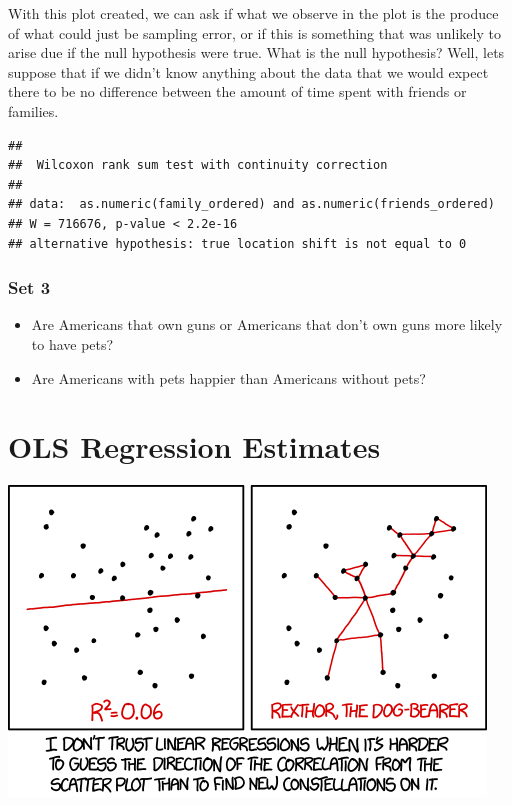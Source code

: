 \documentclass[
]{book}
\newenvironment{Shaded}{\begin{snugshade}}{\end{snugshade}}
\newcommand{\AttributeTok}[1]{\textcolor[rgb]{0.77,0.63,0.00}{#1}}
\newcommand{\ConstantTok}[1]{\textcolor[rgb]{0.00,0.00,0.00}{#1}}
\newcommand{\DocumentationTok}[1]{\textcolor[rgb]{0.56,0.35,0.01}{\textbf{\textit{#1}}}}
\newcommand{\FunctionTok}[1]{\textcolor[rgb]{0.00,0.00,0.00}{#1}}
\newcommand{\NormalTok}[1]{#1}
\newcommand{\SpecialCharTok}[1]{\textcolor[rgb]{0.00,0.00,0.00}{#1}}
\providecommand{\tightlist}{%
  \setlength{\itemsep}{0pt}\setlength{\parskip}{0pt}}
\theoremstyle{definition}
\theoremstyle{definition}
\theoremstyle{definition}
\theoremstyle{definition}
\theoremstyle{remark}
\begin{document}
With this plot created, we can ask if what we observe in the plot is the produce of what could just be sampling error, or if this is something that was unlikely to arise due if the null hypothesis were true. What is the null hypothesis? Well, lets suppose that if we didn't know anything about the data that we would expect there to be no difference between the amount of time spent with friends or families.

\begin{Shaded}
\end{Shaded}

\begin{verbatim}
## 
##  Wilcoxon rank sum test with continuity correction
## 
## data:  as.numeric(family_ordered) and as.numeric(friends_ordered)
## W = 716676, p-value < 2.2e-16
## alternative hypothesis: true location shift is not equal to 0
\end{verbatim}

\hypertarget{set-3}{%
\subsection{Set 3}\label{set-3}}

\begin{itemize}
\tightlist
\item
  Are Americans that own guns or Americans that don't own guns more likely to have pets?
\item
  Are Americans with pets happier than Americans without pets?
\end{itemize}

\hypertarget{ols-regression-estimates}{%
\chapter{OLS Regression Estimates}\label{ols-regression-estimates}}

\includegraphics{./images/linear_regression.png}
\end{document}
